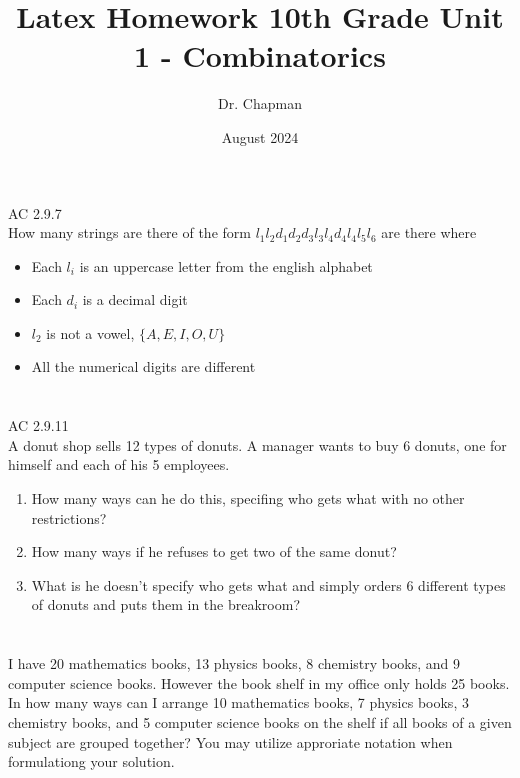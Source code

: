 \documentclass{article}
\title{Latex Homework 10th Grade Unit 1 - Combinatorics}
\author{Dr. Chapman}
\date{August 2024}
\begin{document}
\maketitle

\section{}
AC 2.9.7\\
How many strings are there of the form $l_1l_2d_1d_2d_3l_3l_4d_4l_4l_5l_6$ are there where
\begin{itemize}
  \item Each $l_i$ is an uppercase letter from the english alphabet
  \item Each $d_i$ is a decimal digit
  \item $l_2$ is not a vowel, $\{A, E, I, O, U\}$
  \item All the numerical digits are different
\end{itemize}
\section{}
AC 2.9.11\\
A donut shop sells 12 types of donuts. A manager wants to buy 6 donuts, one for himself and each of his 5 employees.
\begin{enumerate}
    \item How many ways can he do this, specifing who gets what with no other restrictions?
    \item How many ways if he refuses to get two of the same donut?
    \item What is he doesn't specify who gets what and simply orders 6 different types of donuts and puts them in the breakroom?
\end{enumerate}
\section{}
I have 20 mathematics books, 13 physics books, 8 chemistry books, and 9 computer science books. However the book shelf in my office only holds 25 books. In how many ways can I arrange 10 mathematics books, 7 physics books, 3 chemistry books, and 5 computer science books on the shelf if all books of a given subject are grouped together? You may utilize approriate notation when formulationg your solution.
\end{document}
